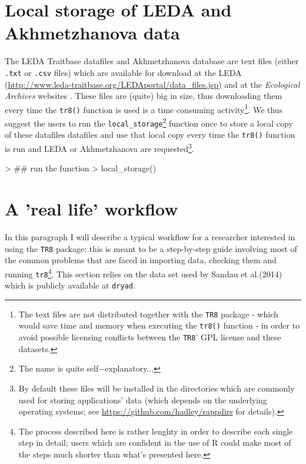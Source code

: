 \documentclass{article}
\begin{document}
  



\section{Local storage of LEDA and Akhmetzhanova data}
\label{sec:leda}

  The LEDA Traitbase datafiles and Akhmetzhanova database are text files (either \texttt{.txt} or \texttt{.csv} files) which are
  available for download at the LEDA (\url{http://www.leda-traitbase.org/LEDAportal/data_files.jsp}) and at the\textit{ Ecological Archives} websites . These
  files are (quite) big in size, thus downloading them every time the
  \texttt{tr8()} function is used is a time consuming
  activity\footnote{The text files are not distributed together with the
    \texttt{TR8} package - which would save time and memory when executing
    the \texttt{tr8()} function - in order to avoid possible licensing
    conflicts between the \texttt{TR8}' GPL license and these datasets.}. We
  thus suggest the users to run the 
  \texttt{local\_storage}\footnote{The name is quite
    self$-$explanatory...} function once to store a local copy of these datafiles
  datafiles and use that local copy every time the \texttt{tr8()} function is run and LEDA or Akhmetzhanova are requested\footnote{By default these files will be installed in the directories which are commonly used for storing applications' data (which depends on the underlying operating systems; see \url{https://github.com/hadley/rappdirs} for details).}.
  
  
\begin{Schunk}
\begin{Sinput}
> ## run the function
> local_storage()
\end{Sinput}
\end{Schunk}



\section{A 'real life' workflow}
\label{sec:workflow}


   In this paragraph I will describe a typical workflow for a researcher
   interested in using the \texttt{TR8} package: this is meant to be a
   step-by-step guide involving most of the common problems that are
   faced in importing data, checking them and running \texttt{tr8}\footnote{The process described here is rather lenghty in order to 
   describe each single step in detail; users which are confident in the use of R could make most of the steps much shorter than what's presented here.}.
    This section relies on the data set used by Sandau et al.(2014)\cite{dryad_Sandau} which is publicly available at \texttt{dryad}\cite{dryad_Sandau}.
  
\end{document}
